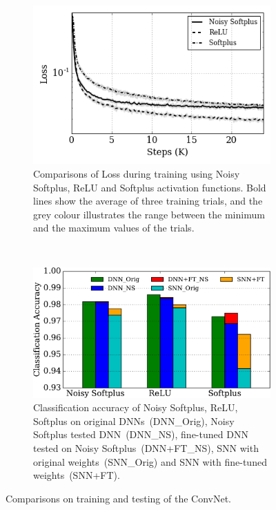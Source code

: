 \documentclass{article}
\begin{document}
\begin{figure}[tbh!]
  \centering
  \begin{subfigure}[t]{0.48\textwidth}
    \includegraphics[width=\textwidth]{pics_iconip/8.png}
    \caption{Comparisons of Loss during training using Noisy Softplus, ReLU and Softplus activation functions. Bold lines show the average of three training trials, and the grey colour illustrates the range between the minimum and the maximum values of the trials.}
    \label{Fig:loss_ns}
  \end{subfigure}~~~
  \begin{subfigure}[t]{0.48\textwidth}
    \includegraphics[width=\textwidth]{pics_iconip/9-2.pdf}
    \caption{Classification accuracy of Noisy Softplus, ReLU, Softplus on original DNNs~(DNN\_Orig), Noisy Softplus tested DNN~(DNN\_NS), fine-tuned DNN tested on Noisy Softplus~(DNN+FT\_NS), SNN with original weights~(SNN\_Orig) and SNN with fine-tuned weights~(SNN+FT).}
    \label{Fig:result_bar}
  \end{subfigure}
  \caption{Comparisons on training and testing of the ConvNet.}
  \label{Fig:performance}
\end{figure}
\end{document}

